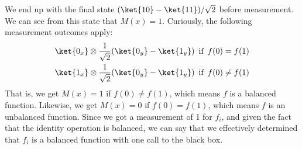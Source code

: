 We end up with the final state $(\ket{10} - \ket{11})/\sqrt2$ before measurement. We can see from this state that $M(x) = 1$. Curiously, the following measurement outcomes apply:
\begin{equation}
  \begin{aligned}
    \ket{0_x} \otimes \dfrac{1}{\sqrt2}(\ket{0_y} - \ket{1_y}) & \, \text{ if } \, f(0) = f(1) \\
    \ket{1_x} \otimes \dfrac{1}{\sqrt2}(\ket{0_y} - \ket{1_y}) & \, \text{ if } \, f(0) \not= f(1)
  \end{aligned}
\end{equation}
That is, we get $M(x) = 1$ if $f(0) \not= f(1)$, which means $f$ is a balanced function. Likewise, we get $M(x) = 0$ if $f(0) = f(1)$, which means $f$ is an unbalanced function. Since we got a measurement of 1 for $f_i$, and given the fact that the identity operation is balanced, we can say that we effectively determined that $f_i$ is a balanced function with one call to the black box.


